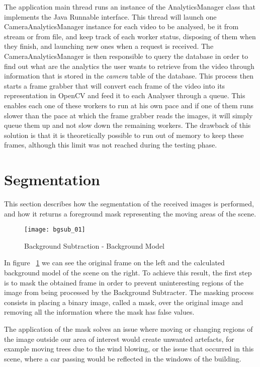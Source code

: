 The application main thread runs an instance of the AnalyticsManager class that implements the Java Runnable interface. This thread will launch one CameraAnalyticsManager instance for each video to be analysed, be it from stream or from file, and keep track of each worker status, disposing of them when they finish, and launching new ones when a request is received. The CameraAnalyticsManager is then responsible to query the database in order to find out what are the analytics the user wants to retrieve from the video through information that is stored in the \textit{camera} table of the database. This process then starts a frame grabber that will convert each frame of the video into its representation in OpenCV and feed it to each Analyser through a queue. This enables each one of these workers to run at his own pace and if one of them runs slower than the pace at which the frame grabber reads the images, it will simply queue them up and not slow down the remaining workers. The drawback of this solution is that it is theoretically possible to run out of memory to keep these frames, although this limit was not reached during the testing phase.

\section{Segmentation}

This section describes how the segmentation of the received images is performed, and how it returns a foreground mask representing the moving areas of the scene. 

\begin{figure}[h]
  \begin{center}
    \leavevmode
    \texttt{[image: bgsub\_01]}
    \caption{Background Subtraction - Background Model}
    \label{fig:bgsub_01}
  \end{center}
\end{figure}

In figure ~\ref{fig:bgsub_01} we can see the original frame on the left and the calculated background model of the scene on the right. To achieve this result, the first step is to mask the obtained frame in order to prevent uninteresting regions of the image from being processed by the Background Subtracter. The masking process consists in placing a binary image, called a mask, over the original image and removing all the information where the mask has false values. 

The application of the mask solves an issue where moving or changing regions of the image outside our area of interest would create unwanted artefacts, for example moving trees due to the wind blowing, or the issue that occurred in this scene, where a car passing would be reflected in the windows of the building.

